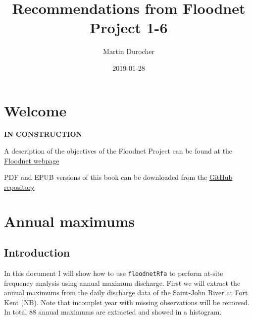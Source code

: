 \documentclass[]{book}
\title{Recommendations from Floodnet Project 1-6}
\author{Martin Durocher}
\date{2019-01-28}
\newenvironment{Shaded}{\begin{snugshade}}{\end{snugshade}}
\newcommand{\DataTypeTok}[1]{\textcolor[rgb]{0.13,0.29,0.53}{#1}}
\newcommand{\DecValTok}[1]{\textcolor[rgb]{0.00,0.00,0.81}{#1}}
\newcommand{\KeywordTok}[1]{\textcolor[rgb]{0.13,0.29,0.53}{\textbf{#1}}}
\newcommand{\NormalTok}[1]{#1}
\newcommand{\OperatorTok}[1]{\textcolor[rgb]{0.81,0.36,0.00}{\textbf{#1}}}
\newcommand{\OtherTok}[1]{\textcolor[rgb]{0.56,0.35,0.01}{#1}}
\newcommand{\StringTok}[1]{\textcolor[rgb]{0.31,0.60,0.02}{#1}}
\theoremstyle{definition}
\theoremstyle{definition}
\theoremstyle{definition}
\theoremstyle{remark}
\begin{document}
\maketitle

{
\setcounter{tocdepth}{1}
\tableofcontents
}
\hypertarget{welcome}{%
\chapter{Welcome}\label{welcome}}

\textbf{IN CONSTRUCTION}

A description of the objectives of the Floodnet Project can be found at
the \href{http://www.nsercfloodnet.ca/}{Floodnet webpage}

PDF and EPUB versions of this book can be downloaded from the
\href{https://github.com/floodnetProject16/recommendations/tree/master/docs}{GitHub
repository}

\hypertarget{amax}{%
\chapter{Annual maximums}\label{amax}}

\hypertarget{introduction}{%
\section{Introduction}\label{introduction}}

In this document I will show how to use \texttt{floodnetRfa} to perform
at-site frequency analysis using annual maximum discharge. First we will
extract the annual maximums from the daily discharge data of the
Saint-John River at Fort Kent (NB). Note that incomplet year with
missing observations will be removed. In total 88 annual maximums are
extracted and showed in a histogram.

\begin{Shaded}
\end{Shaded}
\end{document}
